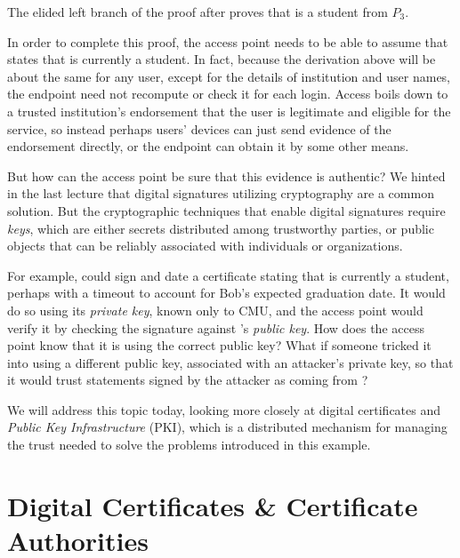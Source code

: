 \documentclass[11pt,twoside]{scrartcl}
\begin{document}
The elided left branch of the proof after  proves that \tli is a student from $P_3$.
\begin{sequentdeduction}
\linfer[alll] {
  \linfer[implyl] {
    \lsequent{}{\says{\cmu}{\isstu(\tli)}}
    &\linfer[id]{\lclose}{\lsequent{\isstu(\tli)}{\isstu(\tli)}}
  } {
    \lsequent{(\says{\cmu}{\isstu(\tli)}) \limply \isstu(\tli)}{\isstu(\tli)}
  }
} {
}
\end{sequentdeduction}
In order to complete this proof, the access point needs to be able to assume that \cmu states that \tli is currently a student. In fact, because the derivation above will be about the same for any user, except for the details of institution and user names, the endpoint need not recompute or check it for each login. Access boils down to a trusted institution's endorsement that the user is legitimate and eligible for the service, so instead perhaps users' devices can just send evidence of the endorsement directly, or the endpoint can obtain it by some other means.

But how can the access point be sure that this evidence is authentic? We hinted in the last lecture that digital signatures utilizing cryptography are a common solution. But the cryptographic techniques that enable digital signatures require \emph{keys}, which are either secrets distributed among trustworthy parties, or public objects that can be reliably associated with individuals or organizations.

For example, \cmu could sign and date a certificate stating that \tli is currently a student, perhaps with a timeout to account for Bob's expected graduation date. It would do so using its \emph{private key}, known only to CMU, and the access point would verify it by checking the signature against \cmu's \emph{public key}. How does the access point know that it is using the correct public key? What if someone tricked it into using a different public key, associated with an attacker's private key, so that it would trust statements signed by the attacker as coming from \cmu? 

We will address this topic today, looking more closely at digital certificates and \emph{Public Key Infrastructure} (PKI), which is a distributed mechanism for managing the trust needed to solve the problems introduced in this example.

\section{Digital Certificates \& Certificate Authorities}
\end{document}
